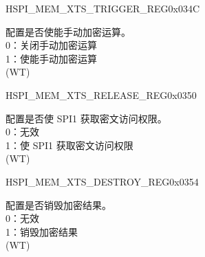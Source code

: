 \begin{register}{H}{SPI\_MEM\_XTS\_TRIGGER\_REG}{0x034C}\label{regdesc:SPIMEMXTSTRIGGERREG}
%
%
\regnewline%
\begin{regdesc}\begin{reglist}
\label{fielddesc:SPIMEMXTSTRIGGER}\item [SPI\_MEM\_XTS\_TRIGGER] 配置是否使能手动加密运算。\\
0：关闭手动加密运算\\
1：使能手动加密运算\\
(WT)
\end{reglist}\end{regdesc}
\end{register}

\begin{register}{H}{SPI\_MEM\_XTS\_RELEASE\_REG}{0x0350}\label{regdesc:SPIMEMXTSRELEASEREG}
%
%
\regnewline%
\begin{regdesc}\begin{reglist}
\label{fielddesc:SPIMEMXTSRELEASE}\item [SPI\_MEM\_XTS\_RELEASE] 配置是否使 SPI1 获取密文访问权限。\\
0：无效\\
1：使 SPI1 获取密文访问权限\\
(WT)
\end{reglist}\end{regdesc}
\end{register}

\begin{register}{H}{SPI\_MEM\_XTS\_DESTROY\_REG}{0x0354}\label{regdesc:SPIMEMXTSDESTROYREG}
%
%
\regnewline%
\begin{regdesc}\begin{reglist}
\label{fielddesc:SPIMEMXTSDESTROY}\item [SPI\_MEM\_XTS\_DESTROY] 配置是否销毁加密结果。\\
0：无效\\
1：销毁加密结果\\
(WT)
\end{reglist}\end{regdesc}
\end{register}


